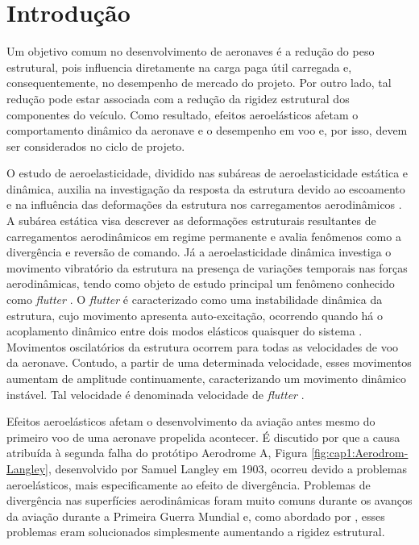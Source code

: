 \chapter{Introdução}\label{cap:introducao}

Um objetivo comum no desenvolvimento de aeronaves é a redução do peso estrutural, pois influencia diretamente na carga paga útil carregada e, consequentemente, no desempenho de mercado do projeto. Por outro lado, tal redução pode estar associada com a redução da rigidez estrutural dos componentes do veículo. Como resultado, efeitos aeroelásticos afetam o comportamento dinâmico da aeronave e o desempenho em voo e, por isso, devem ser considerados no ciclo de projeto.

O estudo de aeroelasticidade, dividido nas subáreas de aeroelasticidade estática e dinâmica, auxilia na investigação da resposta da estrutura devido ao escoamento e na influência das deformações da estrutura nos carregamentos aerodinâmicos \cite{book:Wright-Cooper}. A subárea estática visa descrever as deformações estruturais resultantes de carregamentos aerodinâmicos em regime permanente e avalia fenômenos como a divergência e reversão de comando. Já a aeroelasticidade dinâmica investiga o movimento vibratório da estrutura na presença de variações temporais nas forças aerodinâmicas, tendo como objeto de estudo principal um fenômeno conhecido como \textit{flutter} \cite{art:Collar-1978, art:Garrick&Reed-1981}. O \textit{flutter} é caracterizado como uma instabilidade dinâmica da estrutura, cujo movimento apresenta auto-excitação, ocorrendo quando há o acoplamento dinâmico entre dois modos elásticos quaisquer do sistema \cite{book:Wright-Cooper, art:Sun-2014}. Movimentos oscilatórios da estrutura ocorrem para todas as velocidades de voo da aeronave. Contudo, a partir de uma determinada velocidade, esses movimentos aumentam de amplitude continuamente, caracterizando um movimento dinâmico instável. Tal velocidade é denominada velocidade de \textit{flutter} \cite{book:Wright-Cooper}.

Efeitos aeroelásticos afetam o desenvolvimento da aviação antes mesmo do primeiro voo de uma aeronave propelida acontecer. É discutido por \textcite{book:Bisplinghoff} que a causa atribuída à segunda falha do protótipo Aerodrome A, Figura \ref{fig:cap1:Aerodrom-Langley}, desenvolvido por Samuel Langley em 1903, ocorreu devido a problemas aeroelásticos, mais especificamente ao efeito de divergência. Problemas de divergência nas superfícies aerodinâmicas foram muito comuns durante os avanços da aviação durante a Primeira Guerra Mundial e, como abordado por \textcite{art:Collar-1978}, esses problemas eram solucionados simplesmente aumentando a rigidez estrutural.

